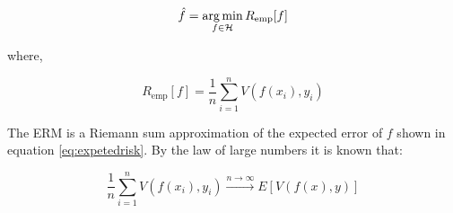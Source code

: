 \begin{equation*}
\hat{f} = \operatorname*{arg\,min}_{f \in \mathcal{H}} R_{\text{emp}}[f] 
\end{equation*}

\noindent where, 

\begin{equation} 
\label{eq:erm}
R_{\text{emp}}[f] = \frac{1}{n} \sum_{i=1}^n V(f(x_i),y_i)   
\end{equation}

The ERM is a Riemann sum approximation of the expected error of $f$ shown in
equation \ref{eq:expetedrisk}. By the law of large numbers it is known that:

\begin{equation}
\frac{1}{n} \sum_{i=1}^n V(f(x_i),y_i) \xrightarrow{n \rightarrow \infty}  E[V(f(x),y)]
\end{equation}

